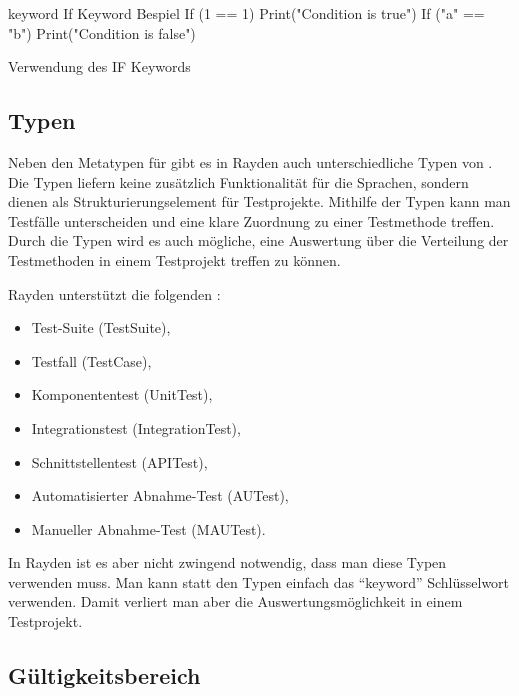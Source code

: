 \begin{program}
\begin{JavaCode}
keyword If Keyword Bespiel {
	If (1 == 1){
		Print("Condition is true")
	}
	If ("a" == "b"){
		Print("Condition is false")
	}
}
\end{JavaCode}
\caption{Verwendung des IF Keywords}
\label{prog:ifKeywordUsage}
\end{program}

\subsection{Typen}
\label{cha:KeywordTypes}

Neben den Metatypen für  gibt es in Rayden auch unterschiedliche Typen von . Die Typen liefern keine zusätzlich Funktionalität für die Sprachen, sondern dienen als Strukturierungselement für Testprojekte. Mithilfe der Typen kann man Testfälle unterscheiden und eine klare Zuordnung zu einer Testmethode treffen. Durch die Typen wird es auch mögliche, eine Auswertung über die Verteilung der Testmethoden in einem Testprojekt treffen zu können. 

\SuperPar
Rayden unterstützt die folgenden :

\begin{itemize}
\item Test-Suite (TestSuite),
\item Testfall (TestCase),
\item Komponententest (UnitTest),
\item Integrationstest (IntegrationTest),
\item Schnittstellentest (APITest),
\item Automatisierter Abnahme-Test (AUTest),
\item Manueller Abnahme-Test (MAUTest).
\end{itemize}

\SuperPar
In Rayden ist es aber nicht zwingend notwendig, dass man diese Typen verwenden muss. Man kann statt den Typen einfach das "`keyword"' Schlüsselwort verwenden. Damit verliert man aber die Auswertungsmöglichkeit in einem Testprojekt. 

\subsection{Gültigkeitsbereich}
\label{cha:KeywordScope}

